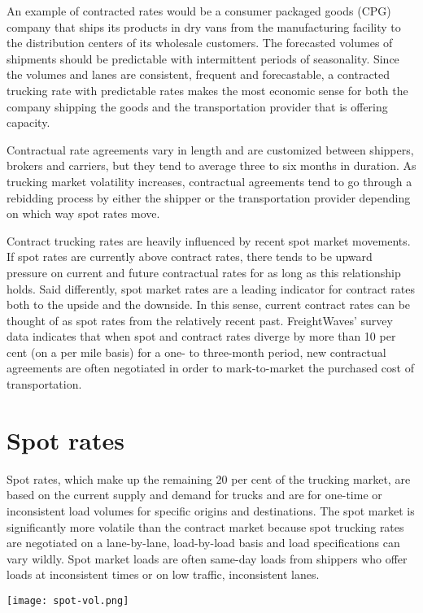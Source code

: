 \documentclass{article}
\begin{document}
An example of contracted rates would be a consumer packaged goods (CPG) company that ships its products in dry vans from the manufacturing facility to the distribution centers of its wholesale customers. The forecasted volumes of shipments should be predictable with intermittent periods of seasonality. Since the volumes and lanes are consistent, frequent and forecastable, a contracted trucking rate with predictable rates makes the most economic sense for both the company shipping the goods and the transportation provider that is offering capacity.  

Contractual rate agreements vary in length and are customized between shippers, brokers and carriers, but they tend to average three to six months in duration. As trucking market volatility increases, contractual agreements tend to go through a rebidding process by either the shipper or the transportation provider depending on which way spot rates move. 

Contract trucking rates are heavily influenced by recent spot market movements. If spot rates are currently above contract rates, there tends to be upward pressure on current and future contractual rates for as long as this relationship holds. Said differently, spot market rates are a leading indicator for contract rates both to the upside and the downside. In this sense, current contract rates can be thought of as spot rates from the relatively recent past. FreightWaves’ survey data indicates that when spot and contract rates diverge by more than 10 per cent (on a per mile basis) for a one- to three-month period, new contractual agreements are often negotiated in order to mark-to-market the purchased cost of transportation.

\section{Spot rates}

	Spot rates, which make up the remaining 20 per cent of the trucking market, are based on the current supply and demand for trucks and are for one-time or inconsistent load volumes for specific origins and destinations. The spot market is significantly more volatile than the contract market because spot trucking rates are negotiated on a lane-by-lane, load-by-load basis and load specifications can vary wildly. Spot market loads are often same-day loads from shippers who offer loads at inconsistent times or on low traffic, inconsistent lanes. 

\texttt{[image: spot-vol.png]}
\end{document}
